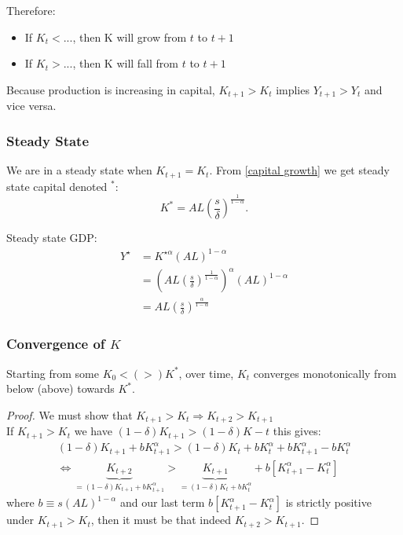 \documentclass[11pt]{article}
\begin{document}
Therefore:
\begin{itemize}
    \item If $K_t < ...$, then K will grow from $t$ to $t+1$ 
    \item If $K_t > ...$, then K will fall from $t$ to $t+1$
\end{itemize}

\begin{note}
    Because production is increasing in capital, $K_{t+1}>K_t$ implies $Y_{t+1} > Y_t$ and vice versa.
\end{note}

\subsubsection{Steady State}
We are in a steady state when $K_{t+1} = K_t$. From \eqref{capital growth} we get steady state capital denoted $^*$:
\begin{equation}
    \label{steady state}
    K^* = AL\left( \dfrac{s}{\delta}\right)^{\frac{1}{1-\alpha}}.
\end{equation}

Steady state GDP:
\begin{equation}
\label{steady state gdp}
\begin{aligned}
Y^{\star} & =K^{\star \alpha}(A L)^{1-\alpha} \\
& =\left(A L\left(\frac{s}{\delta}\right)^{\frac{1}{1-\alpha}}\right)^\alpha(A L)^{1-\alpha} \\
& =A L\left(\frac{s}{\delta}\right)^{\frac{\alpha}{1-\alpha}}
\end{aligned}
\end{equation}

\subsubsection{Convergence of $K$}

Starting from some $K_0<(>)K^*$, over time, $K_t$ converges monotonically from below (above) towards $K^*$.

\begin{proof}
We must show that $K_{t+1}>K_t \Rightarrow K_{t+2}>K_{t+1}$\\
If $K_{t+1}>K_t$ we have $(1-\delta)K_{t+1} > (1-\delta)K-t$ this gives:
\begin{gather*}
    (1-\delta)K_{t+1} + bK_{t+1}^\alpha > (1-\delta)K_{t} + bK_t^\alpha + bK_{t+1}^\alpha - bK_t^\alpha \\
    \Leftrightarrow \underbrace{K_{t+2}}_{=(1-\delta)K_{t+1} + bK_{t+1}^\alpha} > \underbrace{K_{t+1}}_{=(1-\delta)K_{t} + bK_t^\alpha} + b[K_{t+1}^\alpha - K_t^\alpha]
\end{gather*}
where $b \equiv s(AL)^{1-\alpha}$ and our last term $b[K_{t+1}^\alpha - K_t^\alpha]$ is strictly positive under $K_{t+1}>K_t$, then it must be that indeed $K_{t+2}>K_{t+1}.$
\end{proof}
\end{document}
